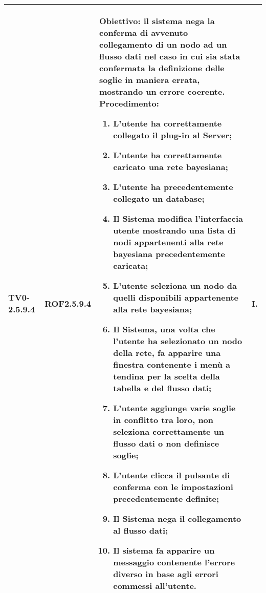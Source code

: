 \begin{longtable}{|C{.15\textwidth}|C{.13\textwidth}|m{.52\textwidth}|C{.08\textwidth}|}
TV0-2.5.9.4 & ROF2.5.9.4  &
	\textbf{Obiettivo}: il sistema nega la conferma di avvenuto collegamento di un nodo ad un flusso dati nel caso in cui sia stata confermata la definizione delle soglie in maniera errata, mostrando un errore coerente. \newline
	\textbf{Procedimento}:
	\begin{enumerate}
		\item L'utente ha correttamente collegato il plug-in al Server;
		\item L'utente ha correttamente caricato una rete bayesiana;
		\item L'utente ha precedentemente collegato un database;
		\item Il Sistema modifica l'interfaccia utente mostrando una lista di nodi appartenenti alla rete bayesiana precedentemente caricata;
		\item L'utente seleziona un nodo da quelli disponibili appartenente alla rete bayesiana;
		\item Il Sistema, una volta che l'utente ha selezionato un nodo della rete, fa apparire una finestra contenente i menù a tendina per la scelta della tabella e del flusso dati;
		\item L'utente aggiunge varie soglie in conflitto tra loro, non seleziona correttamente un flusso dati o non definisce soglie;
		\item L'utente clicca il pulsante di conferma con le impostazioni precedentemente definite;
		\item Il Sistema nega il collegamento al flusso dati;
		\item Il sistema fa apparire un messaggio contenente l'errore diverso in base agli errori commessi all'utente.
	\end{enumerate}
	& I. \\
\hline


\end{longtable}
